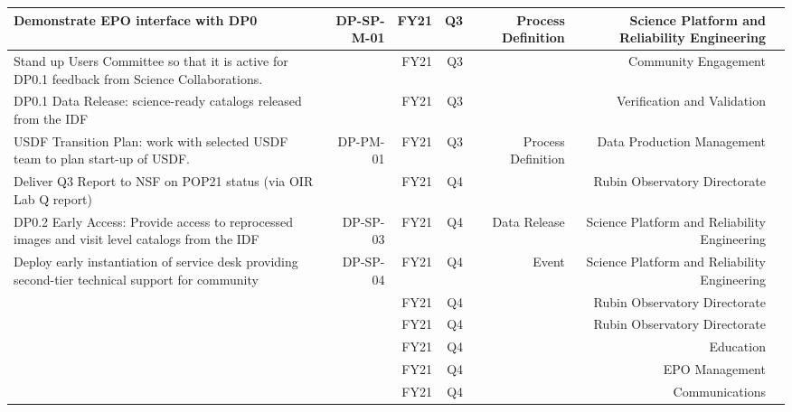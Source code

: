 \begin{longtable} { |p{}  |r  |r  |r  |r  |r  |r |}
{Demonstrate EPO interface with DP0}&{DP-SP-M-01}&{FY21}&{Q3}&{Process Definition}&{Science Platform and Reliability Engineering} \\ \hline
{Stand up Users Committee so that it is active for DP0.1 feedback from Science Collaborations.}&{}&{FY21}&{Q3}&{}&{Community Engagement} \\ \hline
{DP0.1 Data Release: science-ready catalogs released from the IDF}&{}&{FY21}&{Q3}&{}&{Verification and Validation} \\ \hline
{USDF Transition Plan: work with selected USDF team to plan start-up of USDF.}&{DP-PM-01}&{FY21}&{Q3}&{Process Definition}&{Data Production Management} \\ \hline
{Deliver Q3 Report to NSF on POP21 status (via OIR Lab Q report)}&{}&{FY21}&{Q4}&{}&{Rubin Observatory Directorate} \\ \hline
{DP0.2 Early Access: Provide access to reprocessed images and visit level catalogs from the IDF}&{DP-SP-03}&{FY21}&{Q4}&{Data Release}&{Science Platform and Reliability Engineering} \\ \hline
{Deploy early instantiation of service desk providing second-tier technical support for community}&{DP-SP-04}&{FY21}&{Q4}&{Event}&{Science Platform and Reliability Engineering} \\ \hline
{}&{}&{FY21}&{Q4}&{}&{Rubin Observatory Directorate} \\ \hline
{}&{}&{FY21}&{Q4}&{}&{Rubin Observatory Directorate} \\ \hline
{}&{}&{FY21}&{Q4}&{}&{Education} \\ \hline
{}&{}&{FY21}&{Q4}&{}&{EPO Management} \\ \hline
{}&{}&{FY21}&{Q4}&{}&{Communications} \\ \hline
\end{longtable} \normalsize
